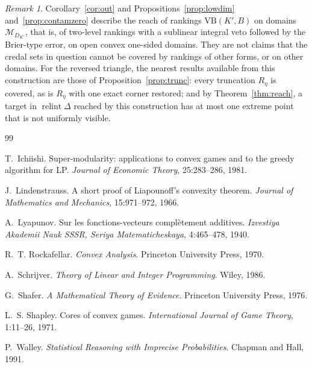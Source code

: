 \documentclass[11pt]{article}
\newcommand{\M}{\mathcal{M}}
\newcommand{\VB}{\mathrm{VB}}
\DeclareMathOperator{\relint}{relint}
\theoremstyle{plain}
\theoremstyle{definition}
\theoremstyle{remark}
\newtheorem{remark}[theorem]{Remark}
\begin{document}
\begin{remark}\label{rem:scope}
Corollary~\ref{cor:out} and Propositions~\ref{prop:lowdim} and~\ref{prop:contamzero}
describe the reach of rankings $\VB(K',B)$ on domains $\M_{D_{K'}}$, that is, of two-level
rankings with a sublinear integral veto followed by the Brier-type error, on open convex
one-sided domains. They are not claims that the credal sets in question cannot be covered
by rankings of other forms, or on other domains. For the reversed triangle, the nearest
results available from this construction are those of Proposition~\ref{prop:trunc}: every
truncation $R_\eta$ is covered, as is $R_\eta$ with one exact corner restored; and by
Theorem~\ref{thm:reach}, a target in $\relint\Delta$ reached by this construction has at
most one extreme point that is not uniformly visible.
\end{remark}

\begin{thebibliography}{99}

T.~Ichiishi.
\newblock Super-modularity: applications to convex games and to the greedy algorithm
for {LP}.
\newblock \emph{Journal of Economic Theory}, 25:283--286, 1981.

J.~Lindenstrauss.
\newblock A short proof of {L}iapounoff's convexity theorem.
\newblock \emph{Journal of Mathematics and Mechanics}, 15:971--972, 1966.

A.~Lyapunov.
\newblock Sur les fonctions-vecteurs compl\`etement additives.
\newblock \emph{Izvestiya Akademii Nauk SSSR, Seriya Matematicheskaya}, 4:465--478,
1940.

R.~T. Rockafellar.
\newblock \emph{Convex Analysis}.
\newblock Princeton University Press, 1970.

A.~Schrijver.
\newblock \emph{Theory of Linear and Integer Programming}.
\newblock Wiley, 1986.

G.~Shafer.
\newblock \emph{A Mathematical Theory of Evidence}.
\newblock Princeton University Press, 1976.

L.~S. Shapley.
\newblock Cores of convex games.
\newblock \emph{International Journal of Game Theory}, 1:11--26, 1971.

P.~Walley.
\newblock \emph{Statistical Reasoning with Imprecise Probabilities}.
\newblock Chapman and Hall, 1991.

\end{thebibliography}
\end{document}
